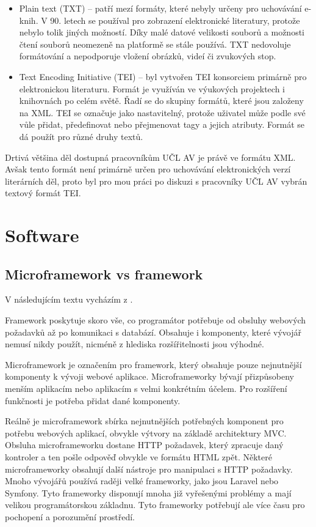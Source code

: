 \begin{itemize}
                \item Plain text (TXT) – patří mezí formáty, které nebyly určeny pro uchovávání e-knih. V 90. letech se používal pro zobrazení elektronické literatury, protože nebylo tolik jiných možností. Díky malé datové velikosti souborů a možnosti čtení souborů neomezeně na platformě se stále používá. TXT nedovoluje formátování a nepodporuje vložení obrázků, videí či zvukových stop.
                
                \item Text Encoding Initiative (TEI) – byl vytvořen TEI konsorciem primárně pro elektronickou literaturu. Formát je využíván ve výukových projektech i knihovnách po celém světě. Řadí se do skupiny formátů, které jsou založeny na XML. TEI se označuje jako nastavitelný, protože uživatel může podle své vůle přidat, předefinovat nebo přejmenovat tagy a jejich atributy. Formát se dá použít pro různé druhy textů.
            \end{itemize}
            
            Drtivá většina děl dostupná pracovníkům UČL AV je právě ve formátu XML. Avšak tento formát není primárně určen pro uchovávání elektronických verzí literárních děl, proto byl pro mou práci po diskuzi s pracovníky UČL AV vybrán textový formát TEI.
    \section{Software}
        \subsection{Microframework vs framework}
            V následujícím textu vycházím z \cite{microframework-vs-framework}.
            
            Framework poskytuje skoro vše, co programátor potřebuje od obsluhy webových požadavků až po komunikaci s databází. Obsahuje i komponenty, které vývojář nemusí nikdy použít, nicméně z hlediska rozšířitelnosti jsou výhodné.
            
            Microframework je označením pro framework, který obsahuje pouze nejnutnější komponenty k vývoji webové aplikace. Microframeworky bývají přizpůsobeny menším aplikacím nebo aplikacím s velmi konkrétním účelem. Pro rozšíření funkčnosti je potřeba přidat dané komponenty.
            
            Reálně je microframework sbírka nejnutnějších potřebných komponent pro potřebu webových aplikací, obvykle výtvory na základě architektury MVC. Obsluha microframeworku dostane HTTP požadavek, který zpracuje daný kontroler a ten pošle odpověď obvykle ve formátu HTML zpět. Některé microframeworky obsahují další nástroje pro manipulaci s HTTP požadavky. Mnoho vývojářů používá raději velké frameworky, jako jsou Laravel nebo Symfony. Tyto frameworky disponují mnoha již vyřešenými problémy a mají velikou programátorskou základnu. Tyto frameworky potřebují ale více času pro pochopení a porozumění prostředí. 
            
